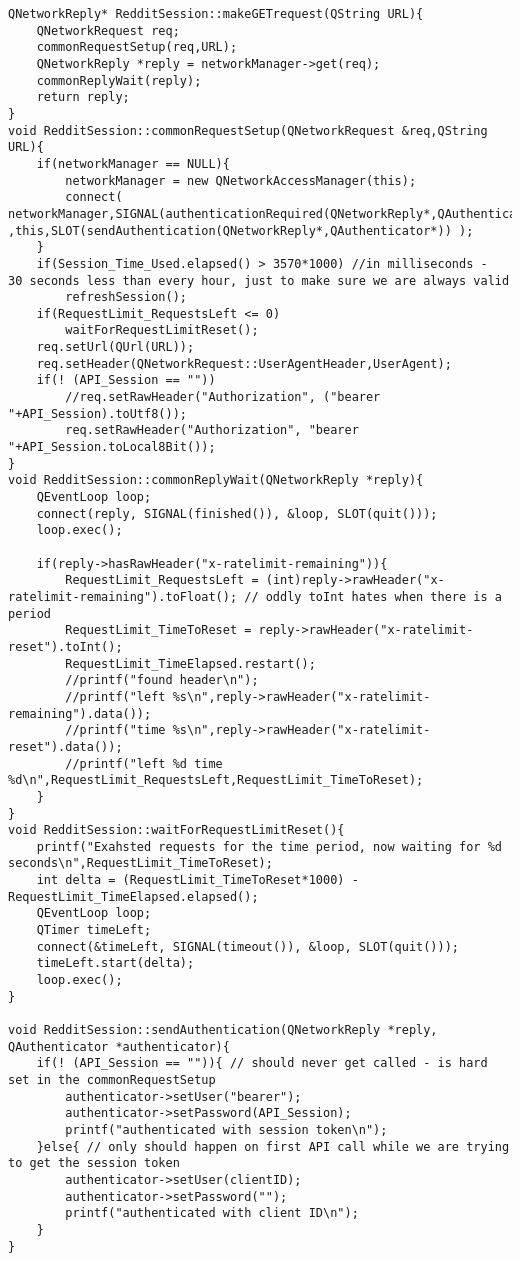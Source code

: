 \documentclass[12pt]{article}
\begin{document}
\begin{verbatim}
QNetworkReply* RedditSession::makeGETrequest(QString URL){
	QNetworkRequest req;
	commonRequestSetup(req,URL);
	QNetworkReply *reply = networkManager->get(req);
	commonReplyWait(reply);
	return reply;
}
void RedditSession::commonRequestSetup(QNetworkRequest &req,QString URL){
	if(networkManager == NULL){
		networkManager = new QNetworkAccessManager(this);
		connect( networkManager,SIGNAL(authenticationRequired(QNetworkReply*,QAuthenticator*)) ,this,SLOT(sendAuthentication(QNetworkReply*,QAuthenticator*)) );
	}
	if(Session_Time_Used.elapsed() > 3570*1000) //in milliseconds -  30 seconds less than every hour, just to make sure we are always valid
		refreshSession();
	if(RequestLimit_RequestsLeft <= 0)
		waitForRequestLimitReset();
	req.setUrl(QUrl(URL));
	req.setHeader(QNetworkRequest::UserAgentHeader,UserAgent);
	if(! (API_Session == ""))
		//req.setRawHeader("Authorization", ("bearer "+API_Session).toUtf8());
		req.setRawHeader("Authorization", "bearer "+API_Session.toLocal8Bit());
}
void RedditSession::commonReplyWait(QNetworkReply *reply){
	QEventLoop loop;
	connect(reply, SIGNAL(finished()), &loop, SLOT(quit()));
	loop.exec();

	if(reply->hasRawHeader("x-ratelimit-remaining")){
		RequestLimit_RequestsLeft = (int)reply->rawHeader("x-ratelimit-remaining").toFloat(); // oddly toInt hates when there is a period
		RequestLimit_TimeToReset = reply->rawHeader("x-ratelimit-reset").toInt();
		RequestLimit_TimeElapsed.restart();
		//printf("found header\n");
		//printf("left %s\n",reply->rawHeader("x-ratelimit-remaining").data());
		//printf("time %s\n",reply->rawHeader("x-ratelimit-reset").data());
		//printf("left %d time %d\n",RequestLimit_RequestsLeft,RequestLimit_TimeToReset);
	}
}
void RedditSession::waitForRequestLimitReset(){
	printf("Exahsted requests for the time period, now waiting for %d seconds\n",RequestLimit_TimeToReset);
	int delta = (RequestLimit_TimeToReset*1000) - RequestLimit_TimeElapsed.elapsed();
	QEventLoop loop;
	QTimer timeLeft;
	connect(&timeLeft, SIGNAL(timeout()), &loop, SLOT(quit()));
	timeLeft.start(delta);
	loop.exec();
}

void RedditSession::sendAuthentication(QNetworkReply *reply, QAuthenticator *authenticator){
	if(! (API_Session == "")){ // should never get called - is hard set in the commonRequestSetup
		authenticator->setUser("bearer");
		authenticator->setPassword(API_Session);
		printf("authenticated with session token\n");
	}else{ // only should happen on first API call while we are trying to get the session token
		authenticator->setUser(clientID);
		authenticator->setPassword("");
		printf("authenticated with client ID\n");
	}
}


\end{verbatim}
\end{document}
